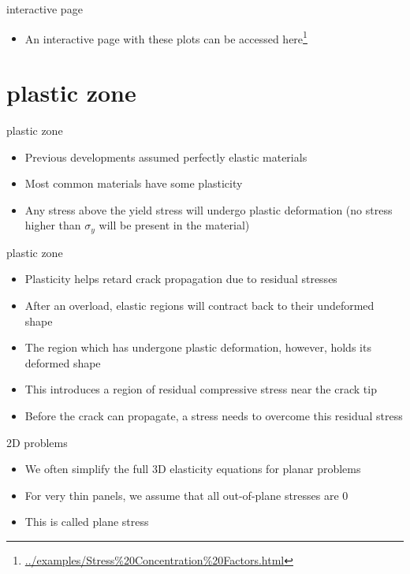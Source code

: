 \documentclass[
  letterpaper,
  ignorenonframetext,
  aspectratio=43,
  handout,
  12pt]{beamer}
\DeclareRobustCommand{\href}[2]{#2\footnote{\url{#1}}}
\providecommand{\tightlist}{%
  \setlength{\itemsep}{0pt}\setlength{\parskip}{0pt}}
\providecommand{\tightlist}{%
\setlength{\itemsep}{0pt}\setlength{\parskip}{0pt}}
\begin{document}
\begin{frame}{interactive page}
\protect\hypertarget{interactive-page}{}
\begin{itemize}
\tightlist
\item
  An interactive page with these plots can be accessed
  \href{../examples/Stress\%20Concentration\%20Factors.html}{here}
\end{itemize}
\end{frame}

\hypertarget{plastic-zone}{%
\section{plastic zone}\label{plastic-zone}}

\begin{frame}{plastic zone}
\protect\hypertarget{plastic-zone-1}{}
\begin{itemize}
\tightlist
\item
  Previous developments assumed perfectly elastic materials
\item
  Most common materials have some plasticity
\item
  Any stress above the yield stress will undergo plastic deformation (no
  stress higher than \(\sigma_y\) will be present in the material)
\end{itemize}
\end{frame}

\begin{frame}{plastic zone}
\protect\hypertarget{plastic-zone-2}{}
\begin{itemize}
\tightlist
\item
  Plasticity helps retard crack propagation due to residual stresses
\item
  After an overload, elastic regions will contract back to their
  undeformed shape
\item
  The region which has undergone plastic deformation, however, holds its
  deformed shape
\item
  This introduces a region of residual compressive stress near the crack
  tip
\item
  Before the crack can propagate, a stress needs to overcome this
  residual stress
\end{itemize}
\end{frame}

\begin{frame}{2D problems}
\protect\hypertarget{d-problems}{}
\begin{itemize}
\tightlist
\item
  We often simplify the full 3D elasticity equations for planar problems
\item
  For very thin panels, we assume that all out-of-plane stresses are 0
\item
  This is called plane stress
\end{itemize}
\end{frame}
\end{document}
